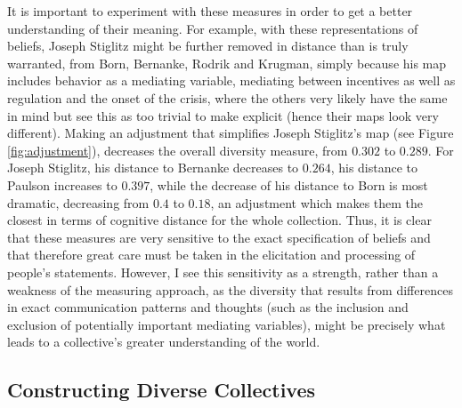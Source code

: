 \documentclass[11pt]{article}
\begin{document}
It is important to experiment with these measures in order to get a better understanding of their meaning. For example, with these representations of beliefs, Joseph Stiglitz might be further removed in distance than is truly warranted, from Born, Bernanke, Rodrik and Krugman, simply because his map includes behavior as a mediating variable, mediating between incentives as well as regulation and the onset of the crisis, where the others very likely have the same in mind but see this as too trivial to make explicit (hence their maps look very different). Making an adjustment that simplifies Joseph Stiglitz's map (see Figure \ref{fig:adjustment}), decreases the overall diversity measure, from $0.302$ to $0.289$. For Joseph Stiglitz, his distance to Bernanke decreases to $0.264$, his distance to Paulson increases to $0.397$, while the decrease of his distance to Born is most dramatic, decreasing from $0.4$ to $0.18$, an adjustment which makes them the closest in terms of cognitive distance for the whole collection. Thus, it is clear that these measures are very sensitive to the exact specification of beliefs and that therefore great care must be taken in the elicitation and processing of people's statements. However, I see this sensitivity as a strength, rather than a weakness of the measuring approach, as the diversity that results from differences in exact communication patterns and thoughts (such as the inclusion and exclusion of potentially important mediating variables), might be precisely what leads to a collective's greater understanding of the world.
\subsection{Constructing Diverse Collectives}
\label{sec-4-4}
\end{document}
